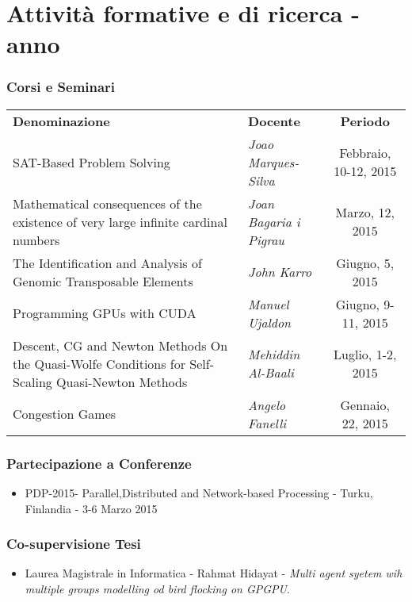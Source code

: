 \part{Attività formative e di ricerca -   anno}
\section{Corsi e Seminari }
	\begin{tabular}{ p{6cm}  l c }
	\toprule
	\rowcolor{gray!65}	
	\textbf{Denominazione} & \textbf{Docente} & \textbf{Periodo}  \\
		\rowcolor{gray!15}	
	SAT-Based Problem Solving & \textit{Joao Marques-Silva} &  Febbraio, 10-12,
	2015 \\
	  \rowcolor{gray!35}
	Mathematical consequences of the existence of very large 
	infinite cardinal numbers & \textit{Joan Bagaria i Pigrau} &  Marzo, 12,
	2015	 \\
		\rowcolor{gray!15}	
	The Identification and Analysis of
	Genomic Transposable Elements & \textit{John Karro} & Giugno, 5, 2015 \\ 
		\rowcolor{gray!35}	
	 Programming GPUs with CUDA & \textit{Manuel Ujaldon} &
	Giugno, 9-11, 2015 \\  
		\rowcolor{gray!15}	
	Descent, CG and Newton Methods On the Quasi-Wolfe Conditions for Self-Scaling Quasi-Newton Methods  & \textit{Mehiddin Al-Baali} &  Luglio,
	1-2, 2015\\
		\rowcolor{gray!35}	 	   
	Congestion Games   & \textit{Angelo Fanelli} &  Gennaio, 22,
	2015 \\
	  
	\bottomrule
\end{tabular}

\section{Partecipazione a  Conferenze}

\begin{itemize}
	\item PDP-2015- Parallel,Distributed and Network-based Processing - Turku,
	Finlandia - 3-6 Marzo 2015
\end{itemize}


\section{Co-supervisione Tesi}
\begin{itemize}
	\item Laurea Magistrale in Informatica - Rahmat Hidayat - \textit{Multi agent syetem wih multiple groups modelling od bird flocking on GPGPU}.
\end{itemize}

